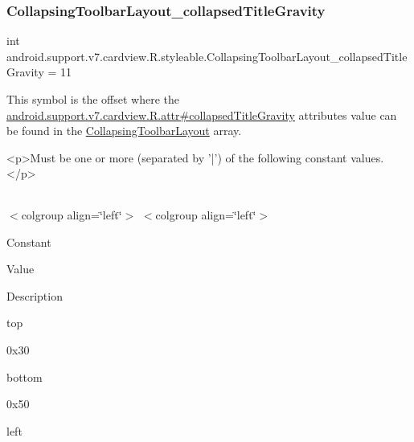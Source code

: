 \mbox{\label{classandroid_1_1support_1_1v7_1_1cardview_1_1R_1_1styleable_aca98ea1812eddbb1cc47a7e5900bd6ac}} 
\subsubsection{\texorpdfstring{Collapsing\+Toolbar\+Layout\+\_\+collapsed\+Title\+Gravity}{CollapsingToolbarLayout\_collapsedTitleGravity}}
{\footnotesize\ttfamily int android.\+support.\+v7.\+cardview.\+R.\+styleable.\+Collapsing\+Toolbar\+Layout\+\_\+collapsed\+Title\+Gravity = 11\hspace{0.3cm}{\ttfamily [static]}}

This symbol is the offset where the \hyperlink{classandroid_1_1support_1_1v7_1_1cardview_1_1R_1_1attr_ad40e98628ccb842b3417d04260e74b66}{android.\+support.\+v7.\+cardview.\+R.\+attr\#collapsed\+Title\+Gravity} attribute\textquotesingle{}s value can be found in the \hyperlink{classandroid_1_1support_1_1v7_1_1cardview_1_1R_1_1styleable_a3b4c5393d0c99cb4e5a7a3911fc606b4}{Collapsing\+Toolbar\+Layout} array.

\begin{DoxyVerb}      <p>Must be one or more (separated by '|') of the following constant values.</p>
\end{DoxyVerb}
 \tabulinesep=1mm
\begin{longtabu} spread 0pt [c]{*{0}{|X[-1]}|}
\hline
\end{longtabu}
$<$colgroup align=\char`\"{}left\char`\"{}$>$ $<$colgroup align=\char`\"{}left\char`\"{}$>$ 

Constant

Value

Description 

{\ttfamily top}

0x30

{\ttfamily bottom}

0x50

{\ttfamily left}

